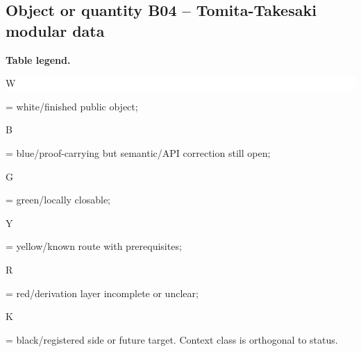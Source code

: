 \subsection*{Object or quantity B04 -- Tomita-Takesaki modular data}
\hypertarget{objproof:B04}{}
\par\smallskip\noindent\begin{minipage}{0.99\linewidth}\footnotesize\raggedright\textbf{Table legend.} \colorbox{white}{\strut W} = white/finished public object; \colorbox{cyan!20}{\strut B} = blue/proof-carrying but semantic/API correction still open; \colorbox{green!18}{\strut G} = green/locally closable; \colorbox{yellow!25}{\strut Y} = yellow/known route with prerequisites; \colorbox{red!20}{\strut R} = red/derivation layer incomplete or unclear; \colorbox{black!18}{\strut K} = black/registered side or future target. Context class is orthogonal to status.\end{minipage}\par\vspace{0.25em}
